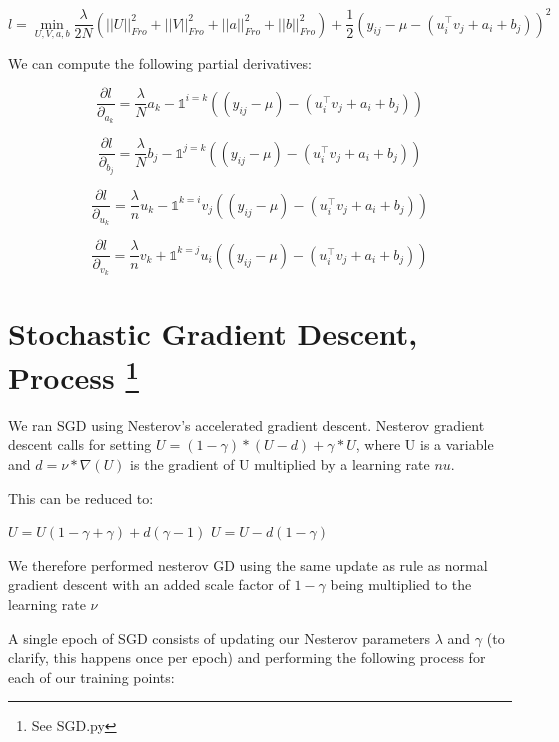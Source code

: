 \documentclass{article}
\begin{document}
$$ l =  \min_{U, V, a, b} \frac{\lambda}{2N} (||U||^{2}_{Fro} + ||V||^{2}_{Fro}
+ ||a||^{2}_{Fro} + ||b||^{2}_{Fro}) + \frac{1}{2} (y_{ij} - \mu - (u_{i}^{\intercal}v_{j} + a_{i} + b_{j}))^{2} $$

We can compute the following partial derivatives:

$$ \frac{\partial l}{\partial_{a_{k}}} = \frac{\lambda}{N} a_{k} - \mathds{1}^{i = k}((y_{ij} - \mu) -
(u_{i}^{\intercal}v_{j} + a_{i} + b_{j})) $$

$$ \frac{\partial l}{\partial_{b_{j}}} = \frac{\lambda}{N} b_{j} - \mathds{1}^{j=k}((y_{ij} - \mu) -
(u_{i}^{\intercal}v_{j} + a_{i} + b_{j})) $$


$$ \frac{\partial l}{\partial_{u_{k}}} = \frac{\lambda}{n} u_{k} - \mathds{1}^{k = i} v_{j}((y_{ij} - \mu) -
(u_{i}^{\intercal}v_{j} + a_{i} + b_{j}))  $$

$$ \frac{\partial l}{\partial_{v_{k}}} = \frac{\lambda}{n} v_{k} + \mathds{1}^{k = j} u_{i}((y_{ij} - \mu) -
(u_{i}^{\intercal}v_{j} + a_{i} + b_{j})) $$

\section*{Stochastic Gradient Descent, Process \footnote{See SGD.py}}

We ran SGD using Nesterov's accelerated gradient descent.
Nesterov gradient descent calls for setting 
$U = (1 - \gamma) * (U - d) + \gamma * U$, where U is
a variable and $d = \nu * \nabla(U)$ is the gradient of U
multiplied by a learning rate $nu$.

This can be reduced to:
\begin{center}
$ U = U(1 - \gamma + \gamma) + d(\gamma - 1) $
$ U = U - d(1 - \gamma) $
\end{center}

We therefore performed nesterov GD using
the same update as rule as normal gradient descent with an
added scale factor of $1 - \gamma$ being multiplied to the
learning rate $\nu$

A single epoch of SGD consists of updating our Nesterov 
parameters $\lambda$ and $\gamma$ (to clarify, this happens once per epoch)
and performing the following process for each of our training points:
\end{document}
